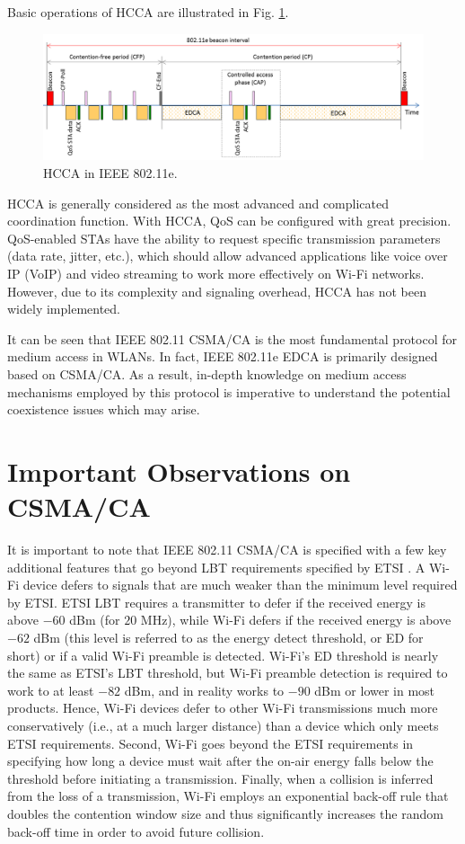 Basic operations of HCCA are illustrated in Fig. \ref{figs:802-11e-HCCA}. 
\begin{figure}[!ht]
	\centering
	\includegraphics[width=1.0\columnwidth]{figs/802-11e-HCCA}
	\caption{HCCA in IEEE 802.11e.}
	\label{figs:802-11e-HCCA}
\end{figure}
HCCA is generally considered as the most advanced and complicated coordination function. With HCCA, QoS can be configured with great precision. QoS-enabled STAs have the ability to request specific transmission parameters (data rate, jitter, etc.), which should allow advanced applications like voice over IP (VoIP) and video streaming to work more effectively on Wi-Fi networks. However, due to its complexity and signaling overhead, HCCA has not been widely implemented.

It can be seen that IEEE 802.11 CSMA/CA is the most fundamental protocol for medium access in WLANs. In fact, IEEE 802.11e EDCA is primarily designed based on CSMA/CA. As a result, in-depth knowledge on medium access mechanisms employed by this protocol is imperative to understand the potential coexistence issues which may arise.


\section{Important Observations on CSMA/CA}
\label{csmaca-obs}

It is important to note that IEEE 802.11 CSMA/CA is specified with a few key additional features that go beyond LBT requirements specified by ETSI \cite{LBT-ETSI-2014}. A Wi-Fi device defers to signals that are much weaker than the minimum level required by ETSI. ETSI LBT requires a transmitter to defer if the received energy is above $-60$ dBm (for $20$ MHz), while Wi-Fi defers if the received energy is above $-62$ dBm (this level is referred to as the energy detect threshold, or ED for short) or if a valid Wi-Fi preamble is detected. Wi-Fi's ED threshold is nearly the same as ETSI's LBT threshold, but Wi-Fi preamble detection is required to work to at least $-82$ dBm, and in reality works to $-90$ dBm or lower in most products. Hence, Wi-Fi devices defer to other Wi-Fi transmissions much more conservatively (i.e., at a much larger distance) than a device which only meets ETSI requirements. Second, Wi-Fi goes beyond the ETSI requirements in specifying how long a device must wait after the on-air energy falls below the threshold before initiating a transmission. Finally, when a collision is inferred from the loss of a transmission, Wi-Fi employs an exponential back-off rule that doubles the contention window size and thus significantly increases the random back-off time in order to avoid future collision.

